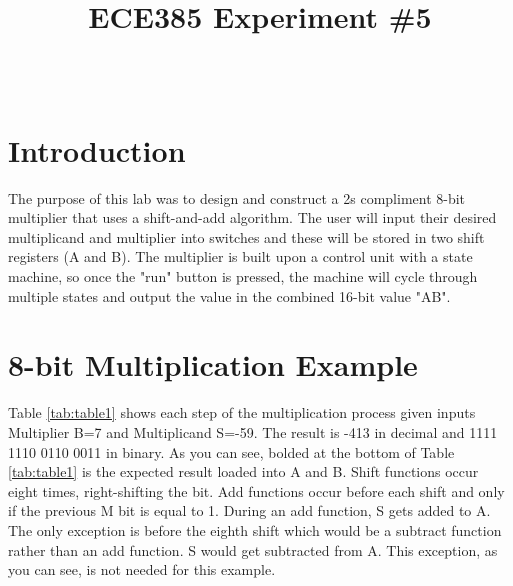 \documentclass[journal, twocolumn, final,11pt,letterpaper]{IEEEtran}
\title{ECE385 Experiment \#5
	}
\author{
\IEEEauthorblockN{Eric Meyers, Ryan Helsdingen}\\
\IEEEauthorblockA{Section ABG; TAs: Ben Delay, Shuo Liu \\
February 24th, 2016 \\
emeyer7, helsdin2}}
\begin{document}
	
\maketitle
\singlespacing

\section{Introduction}
The purpose of this lab was to design and construct a 2s compliment 8-bit multiplier that uses a shift-and-add algorithm. The user will input their desired multiplicand and multiplier into switches and these will be stored in two shift registers (A and B). The multiplier is built upon a control unit with a state machine, so once the "run" button is pressed, the machine will cycle through multiple states and output the value in the combined 16-bit value "AB".

\section{8-bit Multiplication Example}
Table \ref{tab:table1} shows each step of the multiplication process given inputs Multiplier B=7 and Multiplicand S=-59.  The result is -413 in decimal and 1111 1110 0110 0011 in binary.  As you can see, bolded at the bottom of Table \ref{tab:table1} is the expected result loaded into A and B. Shift functions occur eight times, right-shifting the bit.  Add functions occur before each shift and only if the previous M bit is equal to 1.  During an add function, S gets added to A.  The only exception is before the eighth shift which would be a subtract function rather than an add function.  S would get subtracted from A.  This exception, as you can see, is not needed for this example.
\end{document}
